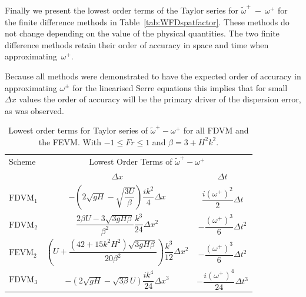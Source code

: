 Finally we present the lowest order terms of the Taylor series for $\widetilde{\omega}^+~-~\omega^+$ for the finite difference methods in Table~\ref{tab:WFDspatfactor}. These methods do not change depending on the value of the physical quantities. The two finite difference methods retain their order of accuracy in space and time when approximating~$\omega^+$.  

Because all methods were demonstrated to have the expected order of accuracy in approximating $\omega^\pm$ for the linearised Serre equations this implies that for small $\Delta x$ values the order of accuracy will be the primary driver of the dispersion error, as was observed.

\begin{table}
	\begin{tabular}{l  c  c}
	\hline
		Scheme & \multicolumn{2}{c}{Lowest Order Terms of $\widetilde{\omega}^+-\omega^+$}\T\B \\
		\cline{2-3}
		& $\Delta x$&$\Delta t$\T\B \\
		\hline
		$\text{FDVM}_1$& $-\left(2 \sqrt{gH} - \sqrt{\dfrac{3U}{\beta }}\right)  \dfrac{ik^2}{4} \Delta x$ & $\dfrac{i \left(\omega^+\right)^2}{2} \Delta t$ \T\B \\
		$\text{FDVM}_2$& $\dfrac{2\beta U -3 \sqrt{3 gH \beta}}{\beta^2}  \dfrac{k^3}{24}\Delta x ^2$ & $- \dfrac{\left(\omega^+\right)^3}{6 }  \Delta t^2$ \T\B \\
		$\text{FEVM}_2$& $\left(U   + \dfrac{\left(42 + 15 k^2H^2\right) \sqrt{3gH \beta}}{20\beta^2}  \right) \dfrac{k^3}{12 } \Delta x^2$ &  $- \dfrac{\left(\omega^+\right)^3}{6 }  \Delta t^2$ \T\B \\
		$\text{FDVM}_3$& $-\left({2\sqrt{gH} - \sqrt{3\beta}U }\right) \dfrac{ik^4}{24} \Delta x^3$ & $-\dfrac{i\left(\omega^+\right)^4}{24 } \Delta t^3$ \T\B  \\ \hline
	\end{tabular}
	\caption{Lowest order terms for Taylor series of $\widetilde{\omega}^+-\omega^+$ for all FDVM and the FEVM. With $  -1 \le Fr \le 1$ and $\beta = 3 + H^2 k^2 $. }
	\label{tab:Wfactor} 
\end{table}


